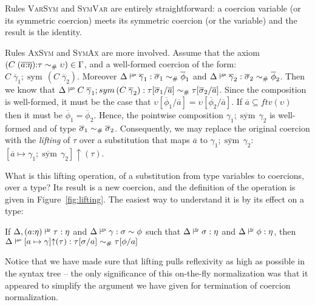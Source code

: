 \documentclass[a4paper,UKenglish]{lipics}
\def\fiddle#1{\hspace*{-0.8ex}\raisebox{0.1ex}{$\scriptscriptstyle#1$}}
\def\rulename#1{\textsc{#1}}
\newcommand{\wfco}{\vdash^{\fiddle{\sf{co}}}}
\newcommand{\wfty}{\vdash^{\fiddle{\sf{ty}}}}
\newcommand{\psim}{\mathrel{\sim_{\tiny \#}}}
\def\rulename#1{\textsc{#1}}
\newcommand{\ol}[1]{\overline{#1}}
\newcommand{\sym}[1]{\mathop{sym}\, #1}
\newcommand{\lifting}[2]{[#1]{\uparrow}(#2)}
\newcommand{\as}{\ol{a}}
\newcommand{\gammas}{\ol{\gamma}}
\newcommand{\phis}{\ol{\phi}}
\newcommand{\sigmas}{\ol{\sigma}}
\begin{document}
\begin{itemize*} 
  \item Rules \rulename{VarSym} and \rulename{SymVar} are entirely straightforward: a coercion variable (or its symmetric coercion) meets its
symmetric coercion (or the variable) and the result is the identity. 

  \item Rules \rulename{AxSym} and \rulename{SymAx} are more involved. Assume that the axiom $(C\;(\ol{a{:}\eta}) {:} \tau \psim \upsilon) \in \Gamma$, and a 
  well-formed coercion of the form: $C\;\gammas_1; \sym{(C\;\gammas_2)}$. Moreover $\Delta \wfco \gammas_1 : \sigmas_1 \psim \phis_1$ and $\Delta \wfco \gammas_2 : \sigmas_2 \psim \phis_2$.
Then we know that $\Delta \wfco C\;\gammas_1; \sym{(C\;\gammas_2)} : \tau[\sigmas_1/\as] \psim \tau[\sigmas_2/\as]$. Since the composition is 
well-formed, it must be the case that $\upsilon[\phis_1/\as] = \upsilon[\phis_2/\as]$. If $\as \subseteq ftv(\upsilon)$ then it must be $\phis_1 = \phis_2$. Hence,
the pointwise composition $\ol{\gamma_1;\sym{\gamma_2}}$ is well-formed and of type $\sigmas_1 \psim \sigmas_2$. Consequently, we may replace the original coercion 
with the {\em lifting} of $\tau$ over a substitution that maps $\as$ to $\ol{\gamma_1;\sym{\gamma_2}}$: $\lifting{\as \mapsto \ol{\gamma_1;\sym{\gamma_2}}}{\tau}$.

What is this lifting operation, of a substitution from type variables to coercions, over a type? 
Its result is a new coercion, and the definition of the operation is given in Figure~\ref{fig:lifting}. 
The easiest way to understand it is by its effect on a type:
\begin{lemma}[Lifting]
If $\Delta,(a{:}\eta) \wfty \tau : \eta$ and
$\Delta \wfco \gamma : \sigma \sim \phi$ such that $\Delta \wfty \sigma : \eta$ and $\Delta \wfty \phi : \eta$, 
then $\Delta \wfco \lifting{a \mapsto \gamma}{\tau} : \tau[\sigma/a] \psim \tau[\phi/a]$
\end{lemma}
Notice that we have made sure that lifting pulls reflexivity as high as possible in the syntax tree -- the only 
significance of this on-the-fly normalization was that it appeared to simplify the argument we have given for termination of 
coercion normalization.


\end{itemize*}
\end{document}
